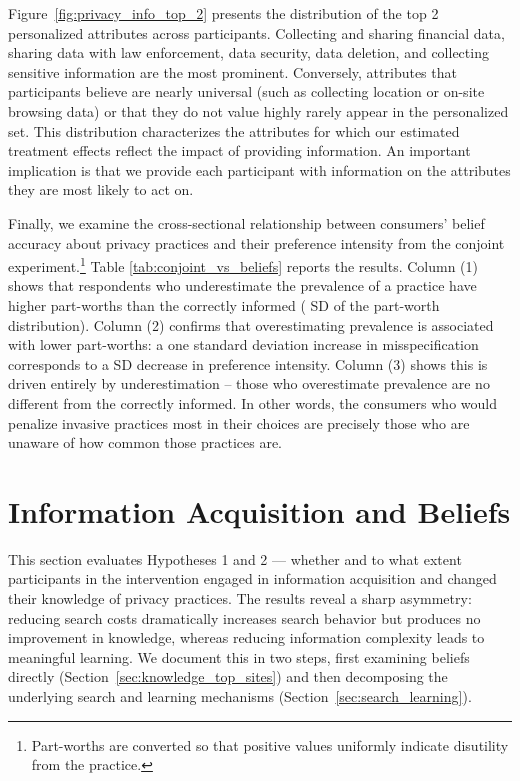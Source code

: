 \documentclass[12pt]{article}
\theoremstyle{definition}
\theoremstyle{remark}
\begin{document}
Figure~\ref{fig:privacy_info_top_2} presents the distribution of the top 2 personalized attributes across participants. Collecting and sharing financial data, sharing data with law enforcement, data security, data deletion, and collecting sensitive information are the most prominent. Conversely, attributes that participants believe are nearly universal (such as collecting location or on-site browsing data) or that they do not value highly rarely appear in the personalized set. This distribution characterizes the attributes for which our estimated treatment effects reflect the impact of providing information. An important implication is that we provide each participant with information on the attributes they are most likely to act on. 

Finally, we examine the cross-sectional relationship between consumers' belief accuracy about privacy practices and their preference intensity from the conjoint experiment.\footnote{Part-worths are converted so that positive values uniformly indicate disutility from the practice.} Table \ref{tab:conjoint_vs_beliefs} reports the results.  Column (1) shows that respondents who underestimate the prevalence of a practice have \misspecUnderPartworth{} higher part-worths than the correctly informed (\misspecUnderSD{} SD of the part-worth distribution). Column (2) confirms that overestimating prevalence is associated with lower part-worths: a one standard deviation increase in misspecification corresponds to a \misspecLinearSD{} SD decrease in preference intensity. Column (3) shows this is driven entirely by underestimation -- those who overestimate prevalence are no different from the correctly informed. In other words, the consumers who would penalize invasive practices most in their choices are precisely those who are unaware of how common those practices are.

\section{Information Acquisition and Beliefs}\label{sec:hyp_info_beliefs}

This section evaluates Hypotheses 1 and 2 --- whether and to what extent participants in the intervention engaged in information acquisition and changed their knowledge of privacy practices. The results reveal a sharp asymmetry: reducing search costs dramatically increases search behavior but produces no improvement in knowledge, whereas reducing information complexity leads to meaningful learning. We document this in two steps, first examining beliefs directly (Section~\ref{sec:knowledge_top_sites}) and then decomposing the underlying search and learning mechanisms (Section~\ref{sec:search_learning}).
 
\end{document}
